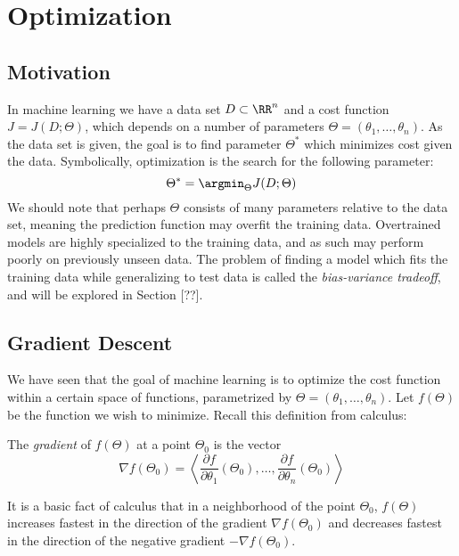 \section{Optimization}

\subsection{Motivation}
\label{sec:optim-motivation}
In machine learning we have a data set $D \subset \RR^n$ and a cost function $J = J(D;\Theta)$, which depends on a number of parameters $\Theta = (\theta_1,\ldots,\theta_n)$. As the data set is given, the goal is to find parameter $\Theta^*$ which minimizes cost given the data. Symbolically, optimization is the search for the following parameter:
\begin{equation}
  \label{eq:min-cost}
  \Theta^* = \argmin_{\Theta} J(D;\Theta)
\end{equation}
We should note that perhaps $\Theta$ consists of many parameters relative to the data set, meaning the prediction function may overfit the training data. Overtrained models are highly specialized to the training data, and as such may perform poorly on previously unseen data. The problem of finding a model which fits the training data while generalizing to test data is called the \emph{bias-variance tradeoff}, and will be explored in Section [??].

\subsection{Gradient Descent}
\label{sec:gradient-descent}

We have seen that the goal of machine learning is to optimize the cost function within a certain space of functions, parametrized by $\Theta = (\theta_1,\ldots,\theta_n)$. Let $f(\Theta)$ be the function we wish to minimize. Recall this definition from calculus:
\begin{definition}
  The \emph{gradient} of $f(\Theta)$ at a point $\Theta_0$ is the vector
  \begin{equation}
    \nabla f (\Theta_0) = \left< \frac{\partial f}{\partial \theta_1}(\Theta_0), \ldots, \frac{\partial f}{\partial \theta_n}(\Theta_0)\right>
  \end{equation}
\end{definition}
It is a basic fact of calculus that in a neighborhood of the point $\Theta_0$, $f(\Theta)$ increases fastest in the direction of the gradient $\nabla f(\Theta_0)$ and decreases fastest in the direction of the negative gradient $-\nabla f(\Theta_0)$.

